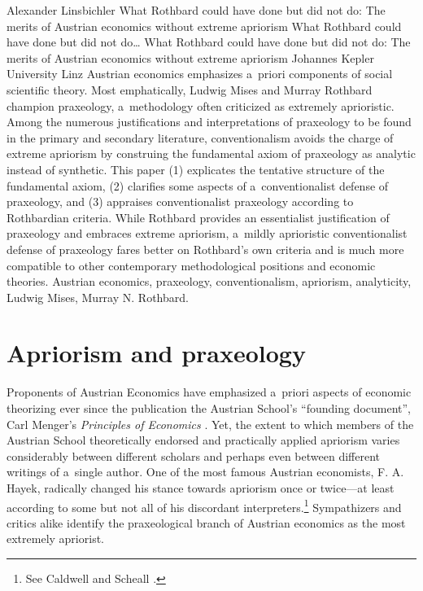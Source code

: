 \begin{artengenv}{Alexander Linsbichler}
	{What Rothbard could have done but did not do: The merits of Austrian economics without extreme apriorism}
	{What Rothbard could have done but did not do\ldots}
	{What Rothbard could have done but did not do: The merits of Austrian economics without extreme apriorism}
	{Johannes Kepler University Linz\label{linsbichler-first}}
	{Austrian economics emphasizes a~priori components of social scientific theory. Most emphatically, Ludwig Mises and Murray Rothbard champion praxeology, a~methodology often criticized as extremely aprioristic. Among the numerous justifications and interpretations of praxeology to be found in the primary and secondary literature, conventionalism avoids the charge of extreme apriorism by construing the fundamental axiom of praxeology as analytic instead of synthetic. This paper (1) explicates the tentative structure of the fundamental axiom, (2) clarifies some aspects of a~conventionalist defense of praxeology, and (3) appraises conventionalist praxeology according to Rothbardian criteria. While Rothbard provides an essentialist justification of praxeology and embraces extreme apriorism, a~mildly aprioristic conventionalist defense of praxeology fares better on Rothbard's own criteria and is much more compatible to other contemporary methodological positions and economic theories.
	}
	{Austrian economics, praxeology, conventionalism, apriorism, analyticity, Ludwig Mises, Murray N. Rothbard.}







\section{Apriorism and praxeology}

\lettrine[loversize=0.13,lines=2,lraise=-0.03,nindent=0em,findent=0.2pt]%
{P}{}roponents of Austrian Economics have emphasized a~priori aspects of economic theorizing ever since the publication the Austrian School's ``founding document'', Carl Menger's \textit{Principles of Economics} 
\parencite*[][]{menger_grundsatze_1871}. %
 Yet, the extent to which members of the Austrian School theoretically endorsed and practically applied apriorism varies considerably between different scholars and perhaps even between different writings of a~single author. One of the most famous Austrian economists, F. A. Hayek, radically changed his stance towards apriorism once or twice---at least according to some but not all of his discordant interpreters.\footnote{See Caldwell 
\parencite*[][]{caldwell_skirmish_2009} %
 and Scheall 
\parencite*[][]{scheall_hayek_2015}.%
} Sympathizers and critics alike identify the praxeological branch of Austrian economics as the most extremely apriorist.




\end{artengenv}
